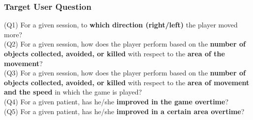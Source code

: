 \documentclass[xcolor=table]{beamer}
\begin{document}
\begin{frame}
\frametitle{Target User Question}
(Q1) For a given session, to \textbf{which direction (right/left)} the player moved more?\\ 
(Q2) For a given session, how does the player perform based on the \textbf{number of objects collected, avoided, or killed} with respect to the \textbf{area of the movement}?\\
(Q3) For a given session, how does the player perform based on the \textbf{number of objects collected, avoided, or killed} with respect to the \textbf{area of movement and the speed} in which the game is played?\\ 
(Q4) For a given patient, has he/she \textbf{improved in the game overtime}?\\ 
(Q5) For a given patient, has he/she \textbf{improved in a certain area overtime}?


\end{frame}
\end{document}
